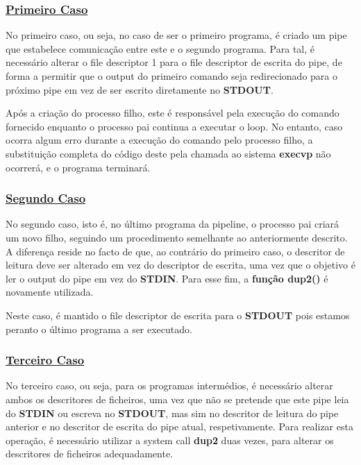 \documentclass{report}
\begin{document}
\subsubsection{\underline{Primeiro Caso}}
No primeiro caso, ou seja, no caso de ser o primeiro programa, é criado um pipe que estabelece comunicação entre este e o segundo programa. Para tal, é necessário alterar o file descriptor 1 para o file descriptor de escrita do pipe, de forma a permitir que o output do primeiro comando seja redirecionado para o próximo pipe em vez de ser escrito diretamente no \textbf{STDOUT}.\par
Após a criação do processo filho, este é responsável pela execução do comando fornecido enquanto o processo pai continua a executar o loop. No entanto, caso ocorra algum erro durante a execução do comando pelo processo filho, a substituição completa do código deste pela chamada ao sistema \textbf{execvp} não ocorrerá, e o programa terminará.

\subsubsection{\underline{Segundo Caso}}
No segundo caso, isto é, no último programa da pipeline, o processo pai criará um novo filho, seguindo um procedimento semelhante ao anteriormente descrito. A diferença reside no facto de que, ao contrário do primeiro caso, o descritor de leitura deve ser alterado em vez do descriptor de escrita, uma vez que o objetivo é ler o output do pipe em vez do \textbf{STDIN}. Para esse fim, a \textbf{função dup2()} é novamente utilizada.\par
Neste caso, é mantido o file descriptor de escrita para o \textbf{STDOUT} pois estamos peranto o último programa a ser executado.

\subsubsection{\underline{Terceiro Caso}}
No terceiro caso, ou seja, para os programas intermédios, é necessário alterar ambos os descritores de ficheiros, uma vez que não se pretende que este pipe leia do \textbf{STDIN} ou escreva no \textbf{STDOUT}, mas sim no descritor de leitura do pipe anterior e no descritor de escrita do pipe atual, respetivamente. Para realizar esta operação, é necessário utilizar a system call \textbf{dup2} duas vezes, para alterar os descritores de ficheiros adequadamente.\\
\end{document}
